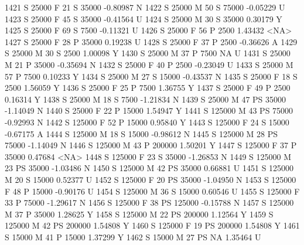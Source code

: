 \documentclass{article}
\begin{document}
\begin{Schunk}
\begin{Soutput}
1421      S      25000   F  21         S  35000  -0.80987    N
1422      S      25000   M  50         S  75000  -0.05229    U
1423      S      25000   F  45         S  35000  -0.41564    U
1424      S      25000   M  30         S  35000   0.30179    Y
1425      S      25000   F  69         S   7500  -0.11321    U
1426      S      25000   F  56         P   2500   1.43432 <NA>
1427      S      25000   F  28         P  35000   0.19238    U
1428      S      25000   F  37         P   2500  -0.36626    A
1429      S      25000   M  30         S   2500   1.00098    Y
1430      S      25000   M  37         P   7500        NA    U
1431      S      25000   M  21         P  35000  -0.35694    N
1432      S      25000   F  40         P   2500  -0.23049    U
1433      S      25000   M  57         P   7500   0.10233    Y
1434      S      25000   M  27         S  15000  -0.43537    N
1435      S      25000   F  18         S   2500   1.56059    Y
1436      S      25000   F  25         P   7500   1.36755    Y
1437      S      25000   F  49         P   2500   0.16314    Y
1438      S      25000   M  18         S   7500  -1.21834    N
1439      S      25000   M  47        PS  35000  -1.14049    N
1440      S      25000   F  22         P  15000   1.54947    Y
1441      S     125000   M  43        PS  75000  -0.92993    N
1442      S     125000   F  52         P  15000   0.95840    Y
1443      S     125000   F  24         S  15000  -0.67175    A
1444      S     125000   M  18         S  15000  -0.98612    N
1445      S     125000   M  28        PS  75000  -1.14049    N
1446      S     125000   M  43         P 200000   1.50201    Y
1447      S     125000   F  37         P  35000   0.47684 <NA>
1448      S     125000   F  23         S  35000  -1.26853    N
1449      S     125000   M  23        PS  35000  -1.03486    N
1450      S     125000   M  42        PS  35000   0.66881    U
1451      S     125000   M  20         S  15000   0.52377    U
1452      S     125000   F  20        PS  35000  -1.04950    N
1453      S     125000   F  48         P  15000  -0.90176    U
1454      S     125000   M  36         S  15000   0.60546    U
1455      S     125000   F  33         P  75000  -1.29617    N
1456      S     125000   F  38        PS 125000  -0.15788    N
1457      S     125000   M  37         P  35000   1.28625    Y
1458      S     125000   M  22        PS 200000   1.12564    Y
1459      S     125000   M  42        PS 200000   1.54808    Y
1460      S     125000   F  19        PS 200000   1.54808    Y
1461      S      15000   M  41         P  15000   1.37299    Y
1462      S      15000   M  27        PS     NA   1.35464    U

\end{Soutput}
\end{Schunk}
\end{document}
